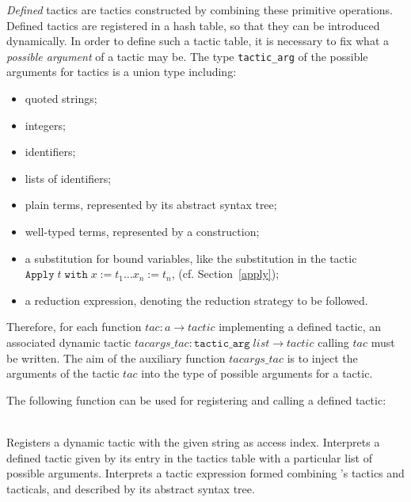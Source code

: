 \textsl{Defined} tactics are tactics constructed by combining these
primitive operations.  Defined tactics are registered in a hash table,
so that they can be introduced dynamically. In order to define such a
tactic table, it is necessary to fix what a \textsl{possible argument}
of a tactic may be. The type \texttt{tactic\_arg} of the possible
arguments for tactics is a union type including:
\begin{itemize}
\item quoted strings;
\item integers;
\item identifiers;
\item lists of identifiers;
\item plain terms, represented by its abstract syntax tree;
\item well-typed terms, represented by a construction;
\item a substitution for bound variables, like the
substitution in the tactic \\$\texttt{Apply}\;t\;\texttt{with}\;x:=t_1\ldots
x_n:=t_n$, (cf. Section~\ref{apply});
\item a reduction expression, denoting the reduction strategy to be
followed.
\end{itemize}
Therefore, for each function $tac:a \rightarrow tactic$ implementing a
defined tactic, an associated dynamic tactic $tacargs\_tac:
\texttt{tactic\_arg}\;list \rightarrow tactic$ calling $tac$ must be
written. The aim of the auxiliary function $tacargs\_tac$ is to inject
the arguments of the tactic $tac$ into the type of possible arguments
for a tactic.

The following function can be used for registering and calling a
defined tactic:

\begin{description}
    {\\ Registers a dynamic tactic with the given string as access index.}
    {Interprets a defined tactic given by its entry in the
     tactics table with a particular list of possible arguments.}
    {Interprets a tactic expression formed combining \Coq's tactics and
          tacticals, and described by its abstract syntax tree.}
\end{description}

